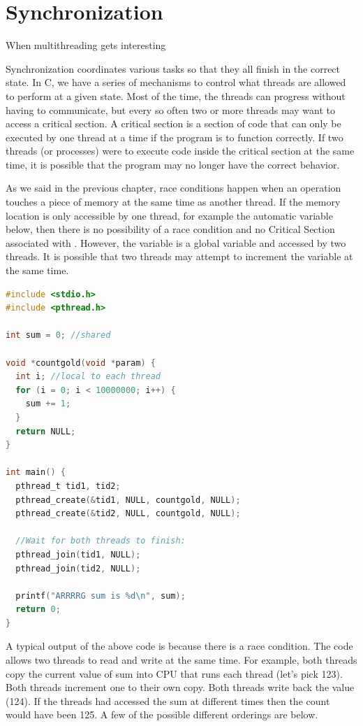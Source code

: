 \chapter{Synchronization}

\epigraph{When multithreading gets interesting}{}

Synchronization coordinates various tasks so that they all finish in the correct state.
In C, we have a series of mechanisms to control what threads are allowed to perform at a given state.
Most of the time, the threads can progress without having to communicate, but every so often two or more threads may want to access a critical section.
A critical section is a section of code that can only be executed by one thread at a time if the program is to function correctly.
If two threads (or processes) were to execute code inside the critical section at the same time, it is possible that the program may no longer have the correct behavior.

As we said in the previous chapter, race conditions happen when an operation touches a piece of memory at the same time as another thread.
If the memory location is only accessible by one thread, for example the automatic variable  below, then there is no possibility of a race condition and no Critical Section associated with .
However, the  variable is a global variable and accessed by two threads.
It is possible that two threads may attempt to increment the variable at the same time.

\begin{lstlisting}[language=C]
#include <stdio.h>
#include <pthread.h>

int sum = 0; //shared

void *countgold(void *param) {
  int i; //local to each thread
  for (i = 0; i < 10000000; i++) {
    sum += 1;
  }
  return NULL;
}

int main() {
  pthread_t tid1, tid2;
  pthread_create(&tid1, NULL, countgold, NULL);
  pthread_create(&tid2, NULL, countgold, NULL);

  //Wait for both threads to finish:
  pthread_join(tid1, NULL);
  pthread_join(tid2, NULL);

  printf("ARRRRG sum is %d\n", sum);
  return 0;
}
\end{lstlisting}

A typical output of the above code is  because there is a race condition.
The code allows two threads to read and write  at the same time.
For example, both threads copy the current value of sum into CPU that runs each thread (let's pick 123).
Both threads increment one to their own copy.
Both threads write back the value (124).
If the threads had accessed the sum at different times then the count would have been 125.
A few of the possible different orderings are below.

